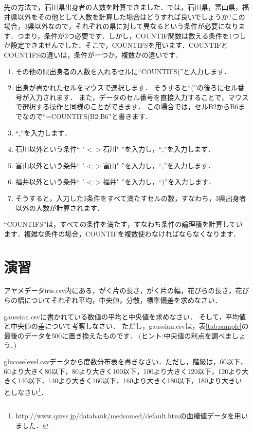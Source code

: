 先の方法で，石川県出身者の人数を計算できました．では，石川県，富山県，福井県以外をその他として人数を計算した場合はどうすれば良いでしょうか?この場合，3県以外なので，それぞれの県に対して異なるという条件が必要になります．つまり，条件が3つ必要です．しかし，COUNTIF関数は数える条件を1つしか設定できませんでした．そこで，COUNTIFSを用います．COUNTIFとCOUNTIFSの違いは，条件が一つか，複数かの違いです．
\begin{enumerate}
    \item その他の県出身者の人数を入れるセルに``COUNTIFS(''と入力します．
    \item 出身が書かれたセルをマウスで選択します．
    そうすると``(''の後ろにセル番号が入力されます．
    また，データのセル番号を直接入力することで，マウスで選択する操作と同様のことができます．
    この場合では，セルB2からB6までなので``=COUNTIFS(B2:B6''と書きます．
    \item ``,''を入力します．
    \item 石川以外という条件`` "$<>$石川" ''を入力し，``,''を入力します．
    \item 富山以外という条件`` "$<>$富山" ''を入力し，``,''を入力します．
    \item 福井以外という条件`` "$<>$福井" ''を入力し，``)''を入力します．
    \item そうすると，入力した3条件をすべて満たすセルの数，すなわち，3県出身者以外の人数が計算されます．
\end{enumerate}
``COUNTIFS''は，すべての条件を満たす，すなわち条件の論理積を計算しています．複雑な条件の場合，COUNTIFを複数使わなければならなくなります．

\section{演習}

\practice
アヤメデータiris.csv内にある，がく片の長さ，がく片の幅，花びらの長さ，花びらの幅についてそれぞれ平均，中央値，分散，標準偏差を求めなさい．

\practice
gaussian.csvに書かれている数値の平均と中央値を求めなさい．
そして，平均値と中央値の差について考察しなさい．
ただし，gaussian.csvは，表\ref{tab:sample}の最後のデータを500に置き換えたものです．
(ヒント:中央値の利点を調べましょう．)

\practice
glucoselevel.csvデータから度数分布表を書きなさい．ただし，階級は，60以下，60より大きく80以下，80より大きく100以下，100より大きく120以下，120より大きく140以下，140より大きく160以下，160より大きく180以下，180より大きい としなさい\footnote{http://www.qmss.jp/databank/medcomed/default.htmの血糖値データを用いました．}．

